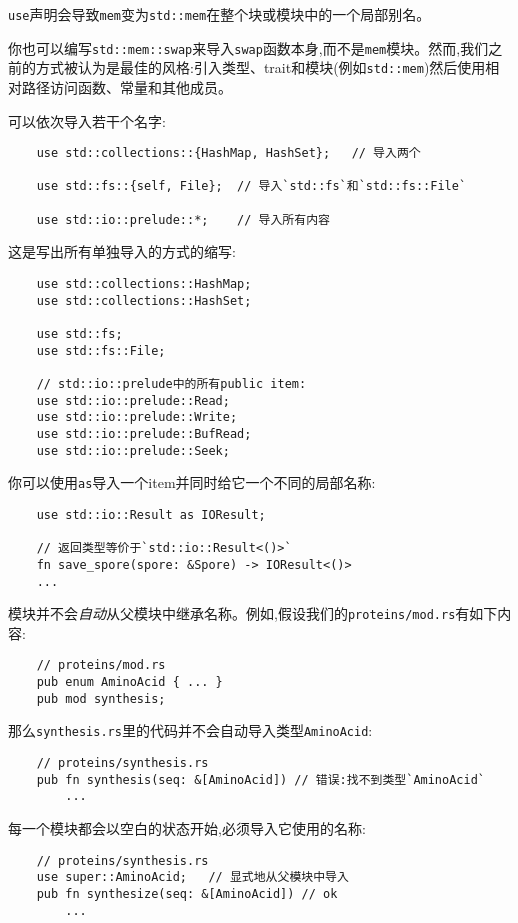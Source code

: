 \texttt{use}声明会导致\texttt{mem}变为\texttt{std::mem}在整个块或模块中的一个局部别名。

你也可以编写\texttt{std::mem::swap}来导入\texttt{swap}函数本身,而不是\texttt{mem}模块。然而,我们之前的方式被认为是最佳的风格:引入类型、trait和模块(例如\texttt{std::mem})然后使用相对路径访问函数、常量和其他成员。

可以依次导入若干个名字:
\begin{verbatim}
    use std::collections::{HashMap, HashSet};   // 导入两个
    
    use std::fs::{self, File};  // 导入`std::fs`和`std::fs::File`
    
    use std::io::prelude::*;    // 导入所有内容
\end{verbatim}

这是写出所有单独导入的方式的缩写:
\begin{verbatim}
    use std::collections::HashMap;
    use std::collections::HashSet;

    use std::fs;
    use std::fs::File;

    // std::io::prelude中的所有public item:
    use std::io::prelude::Read;
    use std::io::prelude::Write;
    use std::io::prelude::BufRead;
    use std::io::prelude::Seek;
\end{verbatim}

你可以使用\texttt{as}导入一个item并同时给它一个不同的局部名称:
\begin{verbatim}
    use std::io::Result as IOResult;

    // 返回类型等价于`std::io::Result<()>`
    fn save_spore(spore: &Spore) -> IOResult<()>
    ...
\end{verbatim}

模块并不会\emph{自动}从父模块中继承名称。例如,假设我们的\texttt{proteins/mod.rs}有如下内容:
\begin{verbatim}
    // proteins/mod.rs
    pub enum AminoAcid { ... }
    pub mod synthesis;
\end{verbatim}

那么\texttt{synthesis.rs}里的代码并不会自动导入类型\texttt{AminoAcid}:
\begin{verbatim}
    // proteins/synthesis.rs
    pub fn synthesis(seq: &[AminoAcid]) // 错误:找不到类型`AminoAcid`
        ...
\end{verbatim}

每一个模块都会以空白的状态开始,必须导入它使用的名称:
\begin{verbatim}
    // proteins/synthesis.rs
    use super::AminoAcid;   // 显式地从父模块中导入
    pub fn synthesize(seq: &[AminoAcid]) // ok
        ...
\end{verbatim}


